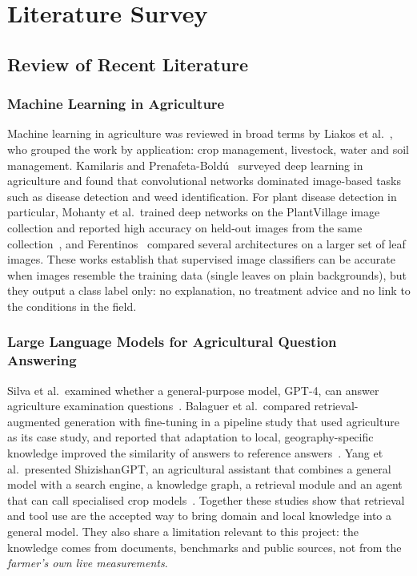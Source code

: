\chapter{Literature Survey}

\section{Review of Recent Literature}

\subsection{Machine Learning in Agriculture}

Machine learning in agriculture was reviewed in broad terms by Liakos et al.~\cite{liakos2018ml}, who grouped the work by
application: crop management, livestock, water and soil management. Kamilaris and Prenafeta-Bold{\'u}~\cite{kamilaris2018deep}
surveyed deep learning in agriculture and found that convolutional networks dominated image-based tasks such as
disease detection and weed identification. For plant disease detection in particular, Mohanty et al.\ trained deep
networks on the PlantVillage image collection and reported high accuracy on held-out images from the same
collection~\cite{mohanty2016plantvillage,hughes2015plantvillage}, and Ferentinos~\cite{ferentinos2018deep} compared several
architectures on a larger set of leaf images. These works establish that supervised image classifiers can be accurate
when images resemble the training data (single leaves on plain backgrounds), but they output a class label only: no
explanation, no treatment advice and no link to the conditions in the field.

\subsection{Large Language Models for Agricultural Question Answering}

Silva et al.\ examined whether a general-purpose model, GPT-4, can answer agriculture examination questions~\cite{silva2023gpt4agronomist}.
Balaguer et al.\ compared retrieval-augmented generation with fine-tuning in a pipeline study that used agriculture as its
case study, and reported that adaptation to local, geography-specific knowledge improved the similarity of answers to
reference answers~\cite{balaguer2024ragvsft}. Yang et al.\ presented ShizishanGPT, an agricultural assistant that combines
a general model with a search engine, a knowledge graph, a retrieval module and an agent that can call specialised
crop models~\cite{yang2024shizishangpt}. Together these studies show that retrieval and tool use are the accepted way to
bring domain and local knowledge into a general model. They also share a limitation relevant to this project: the
knowledge comes from documents, benchmarks and public sources, not from the \emph{farmer's own live measurements}.

